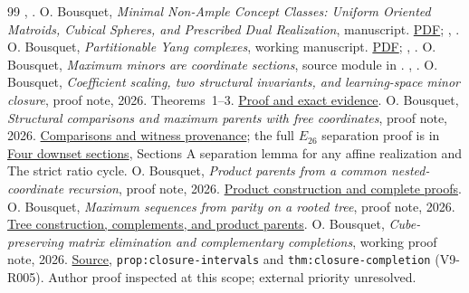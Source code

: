 \documentclass[11pt]{article}
\theoremstyle{definition}
\begin{document}
\begin{thebibliography}{99}
,
.
 O. Bousquet,
\emph{Minimal Non-Ample Concept Classes: Uniform Oriented Matroids,
Cubical Spheres, and Prescribed Dual Realization}, manuscript.
\href{https://research.obousquet.uk/repos/YangDim/minimal_nonample_classes.pdf}{PDF};
, .
 O. Bousquet,
\emph{Partitionable Yang complexes}, working manuscript.
\href{https://research.obousquet.uk/repos/CompressionSchemes/partitionable_yang_complexes.pdf}{PDF};
,
.
 O. Bousquet,
\emph{Maximum minors are coordinate sections}, source module in \cite{Partition}.
,
.
 O. Bousquet,
\emph{Coefficient scaling, two structural invariants, and learning-space minor closure},
proof note, 2026. Theorems~1--3.
\href{https://research.obousquet.uk/repos/PartialCubes/papers/coefficient-topology/COEFFICIENT_SCALING_INTERVALS.md.html}{Proof and exact evidence}.
 O. Bousquet,
\emph{Structural comparisons and maximum parents with free coordinates},
proof note, 2026.
\href{https://research.obousquet.uk/repos/CompressionSchemes/drafts/round984_structural_targets.md.html}{Comparisons and witness provenance};
the full $E_{26}$ separation proof is in
\href{https://research.obousquet.uk/repos/CompressionSchemes/drafts/round824_four_downset_sections.md.html}{Four downset sections},
Sections \textnormal{A separation lemma for any affine realization} and
\textnormal{The strict ratio cycle}.
 O. Bousquet,
\emph{Product parents from a common nested-coordinate recursion},
proof note, 2026.
\href{https://research.obousquet.uk/repos/CompressionSchemes/drafts/round986_nested_flag_products.md.html}{Product construction and complete proofs}.
 O. Bousquet,
\emph{Maximum sequences from parity on a rooted tree},
proof note, 2026.
\href{https://research.obousquet.uk/repos/CompressionSchemes/drafts/round987_tree_parity_flags.md.html}{Tree construction, complements, and product parents}.
 O. Bousquet,
\emph{Cube-preserving matrix elimination and complementary completions},
working proof note, 2026.
\href{../varchenko-ample/research/cube_preserving_elimination.tex}{Source},
\texttt{prop:closure-intervals} and \texttt{thm:closure-completion}
(V9-R005). Author proof inspected at this scope; external priority unresolved.

\end{thebibliography}
\end{document}
